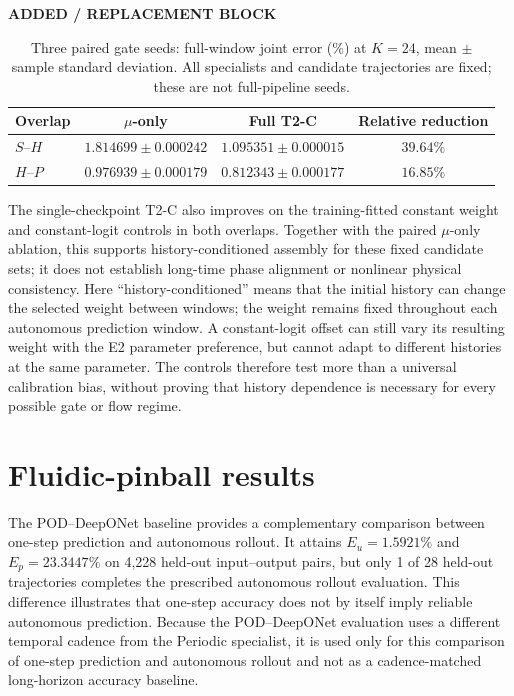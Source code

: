 \documentclass{article}
\providecommand{\DIFaddtex}[1]{{\protect\color{blue} \sf #1}} %
\providecommand{\DIFaddend}{} %
\providecommand{\DIFadd}[1]{\texorpdfstring{\DIFaddtex{#1}}{#1}} %
\begin{document}
{\color{blue}
\begin{table}[H]
\color{blue}\noindent\textbf{ADDED / REPLACEMENT BLOCK}\par
\centering
\caption{Three paired gate seeds: full-window joint error (\%) at
$K=24$, mean $\pm$ sample standard deviation. All specialists and
candidate trajectories are fixed; these are not full-pipeline seeds.}
\label{tab:t2c_window_seeds}
\small
\begin{tabular}{@{}lccc@{}}
\toprule
Overlap & $\mu$-only & Full T2-C & Relative reduction\\
\midrule
$S$--$H$ & $1.814699\pm0.000242$ & $1.095351\pm0.000015$ & $39.64\%$\\
$H$--$P$ & $0.976939\pm0.000179$ & $0.812343\pm0.000177$ & $16.85\%$\\
\bottomrule
\end{tabular}
\end{table}
}




\DIFadd{The single-checkpoint T2-C also improves on the training-fitted constant
weight and constant-logit controls in both overlaps. Together with the
paired $\mu$-only ablation, this supports history-conditioned assembly
for these fixed candidate sets; it does not establish long-time phase
alignment or nonlinear physical consistency.
Here ``history-conditioned'' means that the initial history can change
the selected weight between windows; the weight remains fixed throughout
each autonomous prediction window. A constant-logit offset can still
vary its resulting weight with the E2 parameter preference, but cannot
adapt to different histories at the same parameter. The controls therefore
test more than a universal calibration bias, without proving that history
dependence is necessary for every possible gate or flow regime.
}

\DIFaddend \FloatBarrier
\section{Fluidic-pinball results}
\label{app:pinball}

The POD--DeepONet baseline provides a complementary comparison between
one-step prediction and autonomous rollout. It attains $E_u=1.5921\%$ and $E_p=23.3447\%$ on 4,228 held-out input--output pairs, but only 1 of 28 held-out trajectories completes the prescribed autonomous rollout evaluation. This difference illustrates that one-step accuracy does not by itself imply reliable autonomous prediction. Because the POD--DeepONet evaluation uses a different temporal cadence from
the Periodic specialist, it is used only for this comparison of one-step prediction and autonomous rollout and not as a cadence-matched long-horizon accuracy baseline.
\end{document}
